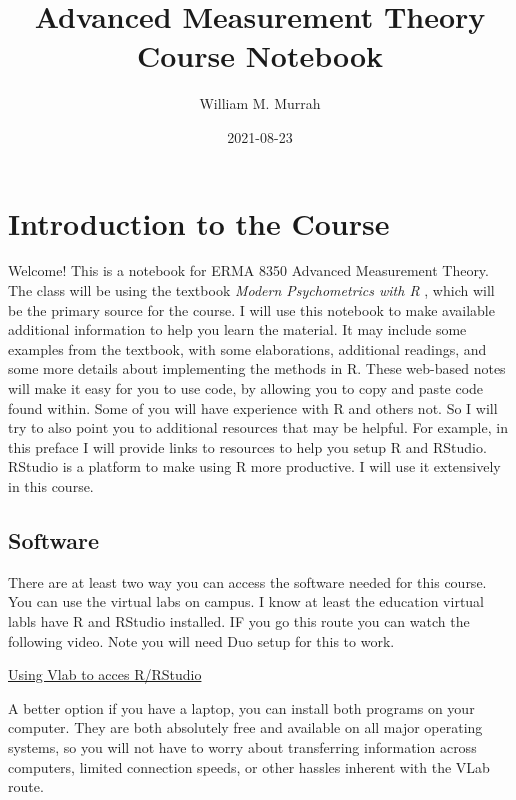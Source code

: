 \documentclass[
]{book}
\title{Advanced Measurement Theory Course Notebook}
\author{William M. Murrah}
\date{2021-08-23}
\begin{document}
\maketitle

{
\setcounter{tocdepth}{1}
\tableofcontents
}
\hypertarget{introduction-to-the-course}{%
\chapter*{Introduction to the Course}\label{introduction-to-the-course}}

Welcome!
This is a notebook for ERMA 8350 Advanced Measurement Theory.
The class will be using the textbook \emph{Modern Psychometrics with R} \citep{mair2018modern}, which will be the primary source for the course.
I will use this notebook to make available additional information to help you learn the material.
It may include some examples from the textbook, with some elaborations, additional readings, and some more details about implementing the methods in R.
These web-based notes will make it easy for you to use code, by allowing you to copy and paste code found within.
Some of you will have experience with R and others not.
So I will try to also point you to additional resources that may be helpful.
For example, in this preface I will provide links to resources to help you setup R and RStudio.
RStudio is a platform to make using R more productive.
I will use it extensively in this course.

\hypertarget{software}{%
\section*{Software}\label{software}}

There are at least two way you can access the software needed for this course.
You can use the virtual labs on campus.
I know at least the education virtual labls have R and RStudio installed.
IF you go this route you can watch the following video.
Note you will need Duo setup for this to work.

\href{https://nv.instructuremedia.com/fetch/QkFoYkIxc0hhUVNIRGFrSE1Hd3JCeWhUREdFPS0tZjk4ODFlYWEyZWFiNWQwYWYyZDk0YTZjMjljZTJlMjBkNmIwMzE5Yw.mp4}{Using Vlab to acces R/RStudio}

A better option if you have a laptop, you can install both programs on your computer.
They are both absolutely free and available on all major operating systems, so you will not have to worry about transferring information across computers, limited connection speeds, or other hassles inherent with the VLab route.
\end{document}
